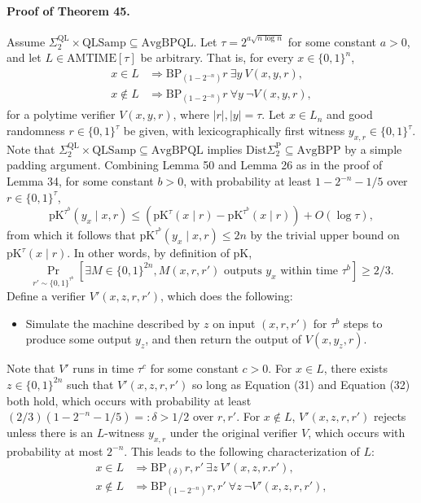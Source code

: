 \documentclass[10pt,a4paper]{article}
\begin{document}
\paragraph{Proof of Theorem 45.} Assume $\Sigma_2^{\mathrm{QL}}\times\mathrm{QLSamp}\subseteq\mathrm{AvgBPQL}$. Let $\tau=2^{a\sqrt{n\log n}}$ for some constant $a>0$, and let $L\in\mathrm{AMTIME}[\tau]$ be arbitrary. That is, for every $x\in\{0,1\}^n$,
\begin{align*}
x\in L&\Longrightarrow\mathrm{BP}_{(1-2^{-n})}r\ \exists y\ V(x,y,r),\\
x\notin L&\Longrightarrow\mathrm{BP}_{(1-2^{-n})}r\ \forall y\ \neg V(x,y,r),
\end{align*}
for a polytime verifier $V(x,y,r)$, where $|r|,|y|=\tau$. Let $x\in L_n$ and good randomness $r\in\{0,1\}^\tau$ be given, with lexicographically first witness $y_{x,r}\in\{0,1\}^\tau$.
Note that $\Sigma_2^{\mathrm{QL}}\times\mathrm{QLSamp}\subseteq\mathrm{AvgBPQL}$ implies $\mathrm{Dist}\Sigma_2^{\mathrm P}\subseteq\mathrm{AvgBPP}$ by a simple padding argument. Combining Lemma 50 and Lemma 26 as in the proof of Lemma 34, for some constant $b>0$, with probability at least $1-2^{-n}-1/5$ over $r\in\{0,1\}^\tau$,
\[\mathrm{pK}^{\tau^b}(y_x\mid x,r)\leq(\mathrm{pK}^\tau(x\mid r)-\mathrm{pK}^{\tau^b}(x\mid r))+O(\log\tau),\tag{31}\]
from which it follows that $\mathrm{pK}^{\tau^b}(y_x\mid x,r)\leq2n$ by the trivial upper bound on $\mathrm{pK}^\tau(x\mid r)$. In other words, by definition of pK,
\[\Pr_{r'\sim\{0,1\}^{\tau^b}}[\exists M\in\{0,1\}^{2n},M(x,r,r')\text{ outputs }y_x\text{ within time }\tau^b]\geq2/3.\tag{32}\]
Define a verifier $V'(x,z,r,r')$, which does the following:
\begin{itemize}
\item Simulate the machine described by $z$ on input $(x,r,r')$ for $\tau^b$ steps to produce some output $y_z$, and then return the output of $V(x,y_z,r)$.
\end{itemize}
Note that $V'$ runs in time $\tau^c$ for some constant $c>0$. For $x\in L$, there exists $z\in\{0,1\}^{2n}$ such that $V'(x,z,r,r')$ so long as Equation (31) and Equation (32) both hold, which occurs with probability at least $(2/3)(1-2^{-n}-1/5)=:\delta>1/2$ over $r,r'$. For $x\notin L$, $V'(x,z,r,r')$ rejects unless there is an $L$-witness $y_{x,r}$ under the original verifier $V$, which occurs with probability at most $2^{-n}$. This leads to the following characterization of $L$:
\begin{align*}
x\in L&\Longrightarrow\mathrm{BP}_{(\delta)}r,r'\ \exists z\ V'(x,z,r.r'),\\
x\notin L&\Longrightarrow\mathrm{BP}_{(1-2^{-n})}r,r'\ \forall z\ \neg V'(x,z,r,r'),
\end{align*}
\end{document}

